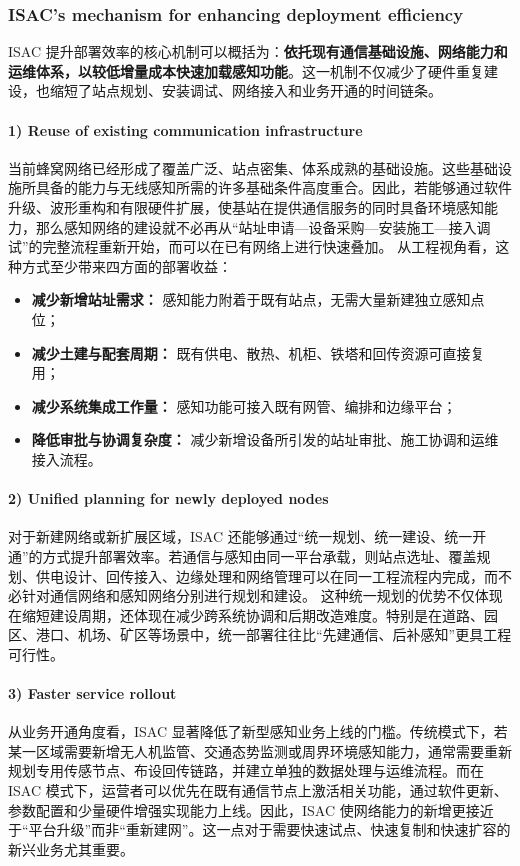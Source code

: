 \subsubsection{ISAC's mechanism for enhancing deployment efficiency}
\label{subsubsec:ch1-isac-core value-deployment-mechanism}

ISAC 提升部署效率的核心机制可以概括为：\textbf{依托现有通信基础设施、网络能力和运维体系，以较低增量成本快速加载感知功能}。这一机制不仅减少了硬件重复建设，也缩短了站点规划、安装调试、网络接入和业务开通的时间链条。
\paragraph{1) Reuse of existing communication infrastructure}
当前蜂窝网络已经形成了覆盖广泛、站点密集、体系成熟的基础设施。这些基础设施所具备的能力与无线感知所需的许多基础条件高度重合。因此，若能够通过软件升级、波形重构和有限硬件扩展，使基站在提供通信服务的同时具备环境感知能力，那么感知网络的建设就不必再从“站址申请—设备采购—安装施工—接入调试”的完整流程重新开始，而可以在已有网络上进行快速叠加。
从工程视角看，这种方式至少带来四方面的部署收益：
\begin{itemize}
    \item \textbf{减少新增站址需求：} 感知能力附着于既有站点，无需大量新建独立感知点位；
    \item \textbf{减少土建与配套周期：} 既有供电、散热、机柜、铁塔和回传资源可直接复用；
    \item \textbf{减少系统集成工作量：} 感知功能可接入既有网管、编排和边缘平台；
    \item \textbf{降低审批与协调复杂度：} 减少新增设备所引发的站址审批、施工协调和运维接入流程。
\end{itemize}
\paragraph{2) Unified planning for newly deployed nodes}
对于新建网络或新扩展区域，ISAC 还能够通过“统一规划、统一建设、统一开通”的方式提升部署效率。若通信与感知由同一平台承载，则站点选址、覆盖规划、供电设计、回传接入、边缘处理和网络管理可以在同一工程流程内完成，而不必针对通信网络和感知网络分别进行规划和建设。  
这种统一规划的优势不仅体现在缩短建设周期，还体现在减少跨系统协调和后期改造难度。特别是在道路、园区、港口、机场、矿区等场景中，统一部署往往比“先建通信、后补感知”更具工程可行性。
\paragraph{3) Faster service rollout}
从业务开通角度看，ISAC 显著降低了新型感知业务上线的门槛。传统模式下，若某一区域需要新增无人机监管、交通态势监测或周界环境感知能力，通常需要重新规划专用传感节点、布设回传链路，并建立单独的数据处理与运维流程。而在 ISAC 模式下，运营者可以优先在既有通信节点上激活相关功能，通过软件更新、参数配置和少量硬件增强实现能力上线。因此，ISAC 使网络能力的新增更接近于“平台升级”而非“重新建网”。这一点对于需要快速试点、快速复制和快速扩容的新兴业务尤其重要。
